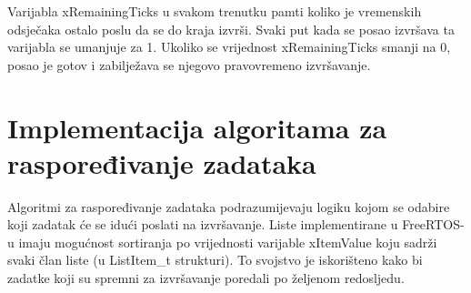 \documentclass[../zavrsni.tex]{subfiles}
\begin{document}
Varijabla xRemainingTicks u svakom trenutku pamti koliko je vremenskih odsječaka ostalo poslu da se do kraja izvrši. 
Svaki put kada se posao izvršava ta varijabla se umanjuje za 1. Ukoliko se vrijednost xRemainingTicks smanji na 0, 
posao je gotov i zabilježava se njegovo pravovremeno izvršavanje.

\section{Implementacija algoritama za raspoređivanje zadataka}

Algoritmi za raspoređivanje zadataka podrazumijevaju logiku kojom se odabire koji zadatak će se idući poslati na izvršavanje.
Liste implementirane u FreeRTOS-u imaju mogućnost sortiranja po vrijednosti varijable xItemValue koju sadrži svaki član liste 
(u ListItem\_t strukturi). To svojstvo je iskorišteno kako bi zadatke koji su spremni za izvršavanje poredali po željenom redosljedu.
\end{document}
